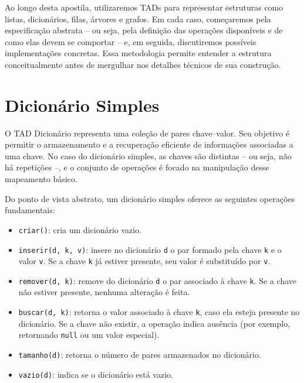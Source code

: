 Ao longo desta apostila, utilizaremos TADs para representar estruturas como listas, dicionários, filas, árvores e grafos. 
Em cada caso, começaremos pela especificação abstrata -- ou seja, pela definição das operações disponíveis e de como elas devem se comportar -- e, em seguida, discutiremos possíveis implementações concretas. 
Essa metodologia permite entender a estrutura conceitualmente antes de mergulhar nos detalhes técnicos de sua construção.

\section{Dicionário Simples}

O TAD Dicionário representa uma coleção de pares chave--valor. Seu objetivo é permitir o armazenamento e a recuperação eficiente de informações associadas a uma chave. 
No caso do dicionário simples, as chaves são distintas -- ou seja, não há repetições --, e o conjunto de operações é focado na manipulação desse mapeamento básico.

Do ponto de vista abstrato, um dicionário simples oferece as seguintes operações fundamentais:

\begin{itemize}
  \item \texttt{criar()}: cria um dicionário vazio.
  
  \item \texttt{inserir(d, k, v)}: insere no dicionário \texttt{d} o par formado pela chave \texttt{k} e o valor \texttt{v}. Se a chave \texttt{k} já estiver presente, seu valor é substituído por \texttt{v}.
  
  \item \texttt{remover(d, k)}: remove do dicionário \texttt{d} o par associado à chave \texttt{k}. Se a chave não estiver presente, nenhuma alteração é feita.
  
  \item \texttt{buscar(d, k)}: retorna o valor associado à chave \texttt{k}, caso ela esteja presente no dicionário. Se a chave não existir, a operação indica ausência (por exemplo, retornando \texttt{null} ou um valor especial).
  
  \item \texttt{tamanho(d)}: retorna o número de pares armazenados no dicionário.
  
  \item \texttt{vazio(d)}: indica se o dicionário está vazio.
\end{itemize}

